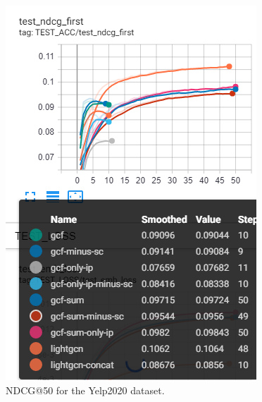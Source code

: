 \begin{figure}[h!]
    \includegraphics[width=\linewidth]{figures/gcf-all-ndcg.png}
    \caption{NDCG@50 for the Yelp2020 dataset.}
    \label{fig:GCF-NDCG-ablation-study}
\end{figure}
